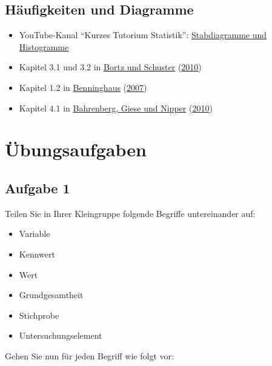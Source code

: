 \documentclass[
  11pt,
  ngerman,
  a4paper,
]{report}
\providecommand{\tightlist}{%
  \setlength{\itemsep}{0pt}\setlength{\parskip}{0pt}}
\begin{document}
\hypertarget{huxe4ufigkeiten-und-diagramme}{%
\subsection{Häufigkeiten und Diagramme}\label{huxe4ufigkeiten-und-diagramme}}

\begin{itemize}
\tightlist
\item
  YouTube-Kanal \enquote{Kurzes Tutorium Statistik}: \href{https://www.youtube.com/watch?v=LkOBRWXnTRQ}{Stabdiagramme und Histogramme}
\item
  Kapitel 3.1 und 3.2 in \protect\hyperlink{ref-bortz}{Bortz und Schuster} (\protect\hyperlink{ref-bortz}{2010})
\item
  Kapitel 1.2 in \protect\hyperlink{ref-benninghaus}{Benninghaus} (\protect\hyperlink{ref-benninghaus}{2007})
\item
  Kapitel 4.1 in \protect\hyperlink{ref-bahrenberg}{Bahrenberg, Giese und Nipper} (\protect\hyperlink{ref-bahrenberg}{2010})
\end{itemize}

\hypertarget{uxfcbungsaufgaben}{%
\section*{Übungsaufgaben}\label{uxfcbungsaufgaben}}

\hypertarget{aufgabe-1}{%
\subsection{Aufgabe 1}\label{aufgabe-1}}

Teilen Sie in Ihrer Kleingruppe folgende Begriffe untereinander auf:

\begin{itemize}
\tightlist
\item
  Variable
\item
  Kennwert
\item
  Wert
\item
  Grundgesamtheit
\item
  Stichprobe
\item
  Untersuchungselement
\end{itemize}

Gehen Sie nun für jeden Begriff wie folgt vor:
\end{document}
